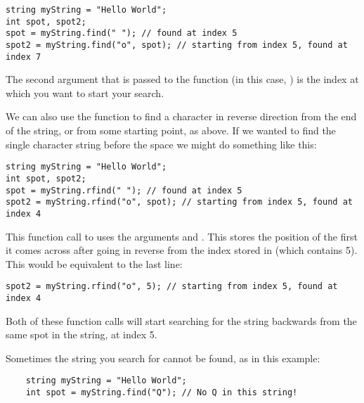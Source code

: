 \noindent\begin{minipage}{\textwidth}\begin{lstlisting}
string myString = "Hello World";
int spot, spot2;
spot = myString.find(" "); // found at index 5
spot2 = myString.find("o", spot); // starting from index 5, found at index 7
\end{lstlisting}\end{minipage}

\noindent The second argument that is passed to the function (in this case, ) is the index at which you want to start your search.

We can also use the  function to find a character in reverse direction from the end of the string, or from some starting point, as above.
If we wanted to find the single character string  before the space we might do something like this:

\noindent\begin{minipage}{\textwidth}\begin{lstlisting}
string myString = "Hello World";
int spot, spot2;
spot = myString.rfind(" "); // found at index 5
spot2 = myString.rfind("o", spot); // starting from index 5, found at index 4
\end{lstlisting}\end{minipage}

\noindent This function call to  uses the arguments  and .
This stores the position of the first  it comes across after going in reverse from the index stored in  (which contains 5).
This would be equivalent to the last line:

\noindent\begin{minipage}{\textwidth}\begin{lstlisting}
spot2 = myString.rfind("o", 5); // starting from index 5, found at index 4
\end{lstlisting}\end{minipage}

\noindent Both of these function calls will start searching for the string  backwards from the same spot in the string, at index 5. 

Sometimes the string you search for cannot be found, as in this example:

\noindent\begin{minipage}{\textwidth}\begin{lstlisting}
	string myString = "Hello World";
	int spot = myString.find("Q"); // No Q in this string!
\end{lstlisting}\end{minipage}


